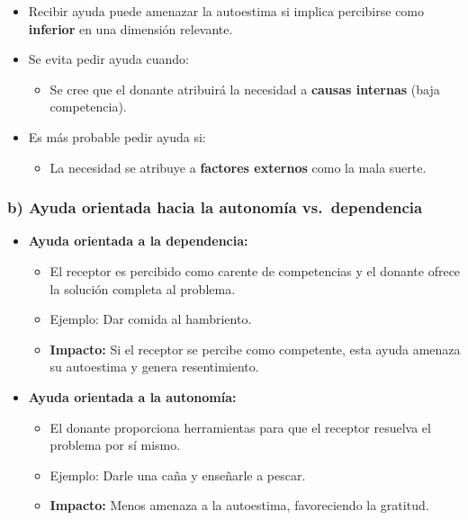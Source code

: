 \documentclass[
]{book}
\providecommand{\tightlist}{%
  \setlength{\itemsep}{0pt}\setlength{\parskip}{0pt}}
\begin{document}
\begin{itemize}
\tightlist
\item
  Recibir ayuda puede amenazar la autoestima si implica percibirse como \textbf{inferior} en una dimensión relevante.
\item
  Se evita pedir ayuda cuando:

  \begin{itemize}
  \tightlist
  \item
    Se cree que el donante atribuirá la necesidad a \textbf{causas internas} (baja competencia).
  \end{itemize}
\item
  Es más probable pedir ayuda si:

  \begin{itemize}
  \tightlist
  \item
    La necesidad se atribuye a \textbf{factores externos} como la mala suerte.
  \end{itemize}
\end{itemize}

\subsubsection{\texorpdfstring{\textbf{b) Ayuda orientada hacia la autonomía vs.~dependencia}}{b) Ayuda orientada hacia la autonomía vs.~dependencia}}\label{b-ayuda-orientada-hacia-la-autonomuxeda-vs.-dependencia}

\begin{itemize}
\tightlist
\item
  \textbf{Ayuda orientada a la dependencia:}

  \begin{itemize}
  \tightlist
  \item
    El receptor es percibido como carente de competencias y el donante ofrece la solución completa al problema.\\
  \item
    Ejemplo: Dar comida al hambriento.\\
  \item
    \textbf{Impacto:} Si el receptor se percibe como competente, esta ayuda amenaza su autoestima y genera resentimiento.\\
  \end{itemize}
\item
  \textbf{Ayuda orientada a la autonomía:}

  \begin{itemize}
  \tightlist
  \item
    El donante proporciona herramientas para que el receptor resuelva el problema por sí mismo.\\
  \item
    Ejemplo: Darle una caña y enseñarle a pescar.\\
  \item
    \textbf{Impacto:} Menos amenaza a la autoestima, favoreciendo la gratitud.
  \end{itemize}
\end{itemize}
\end{document}
